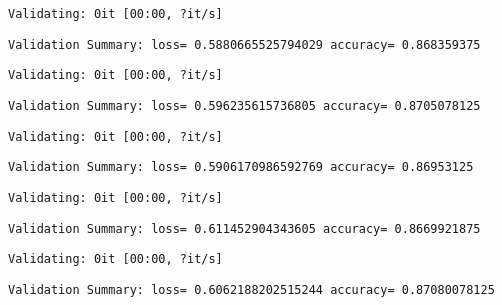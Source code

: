 \documentclass[11pt]{article}
\begin{document}
    
    \begin{Verbatim}[commandchars=\\\{\}]
Validating: 0it [00:00, ?it/s]
    \end{Verbatim}

    
    \begin{Verbatim}[commandchars=\\\{\}]
Validation Summary: loss= 0.5880665525794029 accuracy= 0.868359375
    \end{Verbatim}

    
    \begin{Verbatim}[commandchars=\\\{\}]
Validating: 0it [00:00, ?it/s]
    \end{Verbatim}

    
    \begin{Verbatim}[commandchars=\\\{\}]
Validation Summary: loss= 0.596235615736805 accuracy= 0.8705078125
    \end{Verbatim}

    
    \begin{Verbatim}[commandchars=\\\{\}]
Validating: 0it [00:00, ?it/s]
    \end{Verbatim}

    
    \begin{Verbatim}[commandchars=\\\{\}]
Validation Summary: loss= 0.5906170986592769 accuracy= 0.86953125
    \end{Verbatim}

    
    \begin{Verbatim}[commandchars=\\\{\}]
Validating: 0it [00:00, ?it/s]
    \end{Verbatim}

    
    \begin{Verbatim}[commandchars=\\\{\}]
Validation Summary: loss= 0.611452904343605 accuracy= 0.8669921875
    \end{Verbatim}

    
    \begin{Verbatim}[commandchars=\\\{\}]
Validating: 0it [00:00, ?it/s]
    \end{Verbatim}

    
    \begin{Verbatim}[commandchars=\\\{\}]
Validation Summary: loss= 0.6062188202515244 accuracy= 0.87080078125
    \end{Verbatim}
\end{document}
